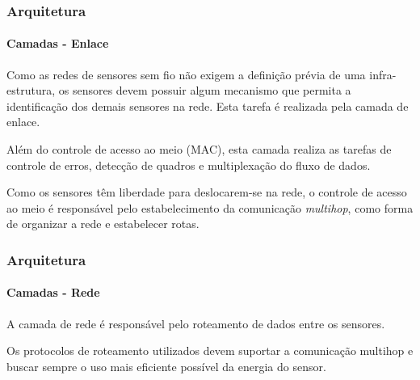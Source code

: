 \documentclass[notes]{beamer}
\begin{document}
\begin{frame}
\frametitle{Arquitetura}
\framesubtitle{Camadas - Enlace}

\begin{block}

Como as redes de sensores sem fio não exigem a definição prévia de uma infra-estrutura, os sensores devem possuir algum mecanismo que permita a identificação dos demais sensores na rede. Esta tarefa é realizada pela camada de enlace.

\end{block} \pause

\begin{block}

Além do controle de acesso ao meio (MAC), esta camada realiza as tarefas de controle de erros, detecção de quadros e multiplexação do fluxo de dados.

\end{block} \pause

\begin{block}

Como os sensores têm liberdade para deslocarem-se na rede, o controle de acesso ao meio é responsável pelo estabelecimento da comunicação \textit{multihop}, como forma de organizar a rede e estabelecer rotas.

\end{block}

\end{frame}

\begin{frame}
\frametitle{Arquitetura}
\framesubtitle{Camadas - Rede}

\begin{block}

A camada de rede é responsável pelo roteamento de dados entre os sensores. 

\end{block} \pause

\begin{alertblock}

Os protocolos de roteamento utilizados devem suportar a comunicação multihop e buscar sempre o uso mais eficiente possível da energia do sensor.

\end{alertblock}

\end{frame}
\end{document}
